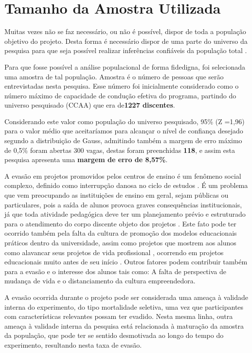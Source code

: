 \section{Tamanho da Amostra Utilizada}

Muitas vezes não se faz necessário, ou não é possível, dispor de toda a população objetivo do projeto. Desta forma é necessário dispor de uma parte do universo da pesquisa para que seja possível realizar inferências confiáveis da população total \cite{marino_manual_2003}.

Para que fosse possível a análise populacional de forma fidedigna, foi selecionada uma amostra de tal população. Amostra é o número de pessoas que serão entrevistadas nesta pesquisa. Esse número foi inicialmente considerado como o número máximo de capacidade de condução efetiva do programa, partindo do universo pesquisado (CCAA) que era de\textbf{1227 discentes}.


Considerando este valor como população do universo pesquisado, 95\% (Z =1,96) para o valor médio que aceitaríamos para alcançar o nível de confiança desejado segundo a distribuição de Gauss, admitindo também a margem de erro máximo de 0,5\% foram abertas 300 vagas, destas foram preenchidas \textbf{118}, e assim esta pesquisa apresenta uma \textbf{margem de erro de 8,57\%}.

A evasão em projetos promovidos pelos centros de ensino é um fenômeno social complexo, definido como interrupção danosa no ciclo de estudos \cite{santos_baggi_dropout_2011}. É um problema que vem preocupando as instituições de ensino em geral, sejam públicas ou particulares, pois a saída de alunos provoca graves consequências institucionais, já que toda atividade pedagógica deve ter um planejamento prévio e estruturado para o atendimento do corpo discente objeto dos projetos \cite{figueiredo_educacao_2017}. 
Este fato pode ter ocorrido também pela falta da cultura de promoção dos modelos educacionais práticos dentro da universidade, assim como projetos que mostrem aos alunos como alavancar seus projetos de vida profissional \cite{nobre_amostragem_2016}, ocorrendo em projetos educacionais muito antes de seu início . Outros fatores podem contribuir também para a evasão e o interesse dos alunos tais como: A falta de perspectiva de mudança de vida e o distanciamento da cultura empreendedora.

A evasão ocorrida durante o projeto pode ser considerada uma ameaça à validade interna do experimento, do tipo mortalidade seletiva, uma vez que participantes com características relevantes possam ter evadido. Nesta mesma linha, outra ameaça à validade interna da pesquisa está relacionada à maturação da amostra da população, que pode ter se sentido desmotivada ao longo do tempo do experimento, resultando nesta taxa de evasão. 

